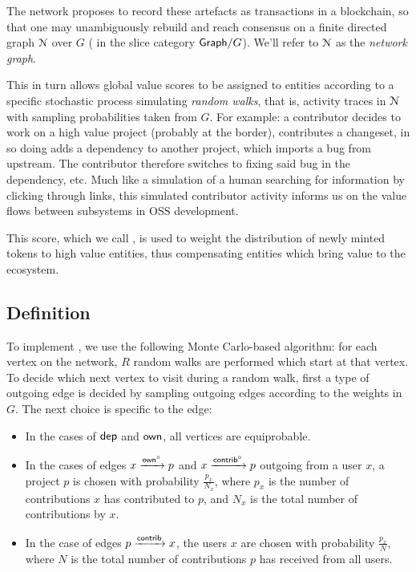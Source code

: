 The \oscoin{} network proposes to record these artefacts as
transactions in a blockchain, so that one may unambiguously rebuild
and reach consensus on a finite directed graph $\mathcal{N}$ over $G$
(\ie{} in the slice category $\mathsf{Graph}/G$). We'll refer to $\mathcal{N}$
as the \emph{network graph}.

This in turn allows global value scores to be assigned to entities
according to a specific stochastic process simulating \emph{random
  walks}, that is, activity traces in $\mathcal{N}$ with sampling
probabilities taken from $G$. For example: a contributor decides to
work on a high value project (probably at the border), contributes a
changeset, in so doing adds a dependency to another project, which imports a
bug from upstream. The contributor therefore switches to fixing said
bug in the dependency, etc. Much like a simulation of a human
searching for information by clicking through links, this simulated
contributor activity informs us on the value flows between subsystems
in OSS development.

This score, which we call \osrank{}, is used to weight the
distribution of newly minted tokens to high value entities, thus
compensating entities which bring value to the ecosystem.

\subsection{Definition}

To implement \osrank{}, we use the following Monte Carlo-based algorithm: for
each vertex on the network, $R$ random walks are performed which start at that
vertex. To decide which next vertex to visit during a random walk, first a type
of outgoing edge is decided by sampling outgoing edges according to the weights
in $G$. The next choice is specific to the edge:

\begin{itemize}
\item In the cases of $\mathsf{dep}$ and $\mathsf{own}$, all vertices are equiprobable.
\item In the cases of edges $x \xrightarrow[]{\mathsf{own}^\circ} p$ and
  $x \xrightarrow[]{\mathsf{contrib}^\circ} p$ outgoing from a user $x$, a project $p$ is
  chosen with probability $\frac{p_x}{N_x}$, where $p_x$ is the number of
  contributions $x$ has contributed to $p$, and $N_x$ is the total number of
  contributions by $x$.
\item In the case of edges $p \xrightarrow[]{\mathsf{contrib}} x$, the users $x$ are
  chosen with probability $\frac{p_x}{N}$, where $N$ is the total number of
  contributions $p$ has received from all users.
\end{itemize}

